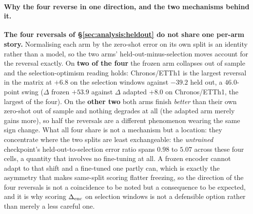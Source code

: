 \paragraph{Why the four reverse in one direction, and the two mechanisms behind it.}
\textbf{The four reversals of \S\ref{sec:analysis:heldout} do not share one per-arm
story.}  Normalising each arm by the zero-shot error on its own split is an identity
rather than a model, so the two arms' held-out-minus-selection moves account for the
reversal exactly.  On \textbf{two of the four} the frozen arm collapses out of sample
and the selection-optimism reading holds: Chronos/ETTh1 is the largest reversal in the
matrix at $+6.8$ on the selection windows against $-39.2$ held out, a $46.0$-point
swing ($\Delta$ frozen $+53.9$ against $\Delta$ adapted $+8.0$ on Chronos/ETTh1, the
largest of the four).  On the \textbf{other two} both arms finish \emph{better} than
their own zero-shot out of sample and nothing degrades at all (the adapted arm
merely gains more), so half the reversals are a different phenomenon wearing the
same sign change.  What all four share is not a mechanism but a location:
they concentrate where the two splits are least exchangeable: the
\emph{untrained} checkpoint's held-out-to-selection error ratio spans $0.98$ to
$5.07$ across these four cells, a quantity that involves no fine-tuning at all.  A
frozen encoder cannot adapt to that shift and a fine-tuned one partly can, which is
exactly the asymmetry that makes same-split scoring flatter freezing, so the
direction of the four reversals is not a coincidence to be noted but a consequence
to be expected, and it is why scoring $\Delta_\text{enc}$ on selection windows is not a
defensible option rather than merely a less careful one.


\begin{table}[!htbp]
\centering
\caption{\textbf{Cross-backbone results ($h{=}24$)}
(\S\ref{sec:forecasting:nonmoirai}). Every non-Moirai cell with a paired
frozen-encoder run: \textbf{selection-split} gate $\Vb{\text{ridge}}$
(\textsuperscript{f}${=}$gate-fail at the $0.20$ operating point; all nine
fail, as does the screened-only TimesFM/Electricity cell, which has no paired run
and so no selection-split gate: it scores $+0.132$ on the held-out windows), CKA
after full fine-tuning, and the two outcome readings as \% change against
zero-shot (\emph{negative is better than zero-shot}). \textbf{Protocol note:}
this arm is univariate OT, lookback 96, $h{=}24$, 200 held-out windows,
per-window $z$-scored; the Moirai arm of \S\ref{sec:forecasting} is lookback
192, $h{=}96$, 300 windows, train-normalised. Gates for both arms come from one
source (\texttt{results/gate\_val\_side.json}, via
\texttt{scripts/cell\_matrix.py}); the two arms are never pooled.}
\label{tab:crossbackbone}

\end{table}


